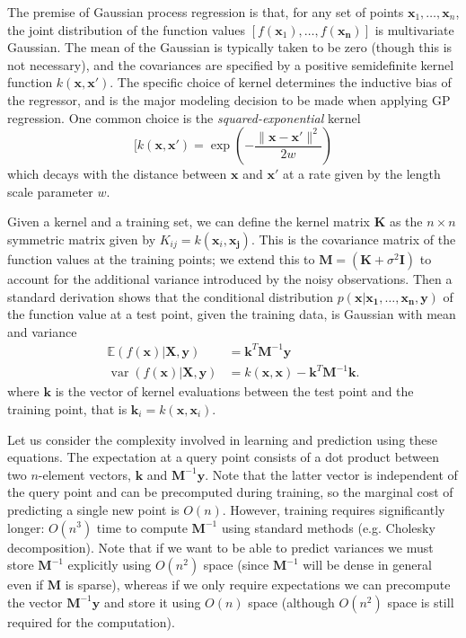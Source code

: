 \documentclass{article}
\DeclareMathOperator*{\var}{var}
\begin{document}
The premise of Gaussian process regression is that, for any set of points $\mathbf{x}_1, \ldots, \mathbf{x}_n$, the joint distribution of the function values $[f(\mathbf{x}_1), \ldots, f(\mathbf{x_n})]$ is multivariate Gaussian. The mean of the Gaussian is typically taken to be zero (though this is not necessary), and the covariances are specified by a positive semidefinite kernel function $k(\mathbf{x}, \mathbf{x'})$. The specific choice of kernel determines the inductive bias of the regressor, and is the major modeling decision to be made when applying GP regression. One common choice is the {\em squared-exponential} kernel\begin{equation}[k(\mathbf{x}, \mathbf{x'}) = \exp\left (- \frac{ \|\mathbf{x} - \mathbf{x'}\|^2 }{2w} \right)\end{equation}
which decays with the distance between $\mathbf{x}$ and $\mathbf{x'}$ at a rate given by the length scale parameter $w$. 

Given a kernel and a training set, we can define the kernel matrix $\mathbf{K}$ as the $n \times n$ symmetric matrix given by $K_{ij} = k(\mathbf{x}_i, \mathbf{x_j})$. This is the covariance matrix of the function values at the training points; we extend this to $\mathbf{M} = (\mathbf{K} + \sigma^2\mathbf{I})$ to account for the additional variance introduced by the noisy observations. Then a standard derivation \cite{rasmussen06} shows that the conditional distribution $p(\mathbf{x} | \mathbf{x_1}, \ldots, \mathbf{x_n}, \mathbf{y})$ of the function value at a test point, given the training data, is Gaussian with mean and variance
\begin{align}
\mathbb{E}(f(\mathbf{x}) | \mathbf{X}, \mathbf{y}) &= \mathbf{k}^T \mathbf{M}^{-1} \mathbf{y}\\
\var(f(\mathbf{x}) | \mathbf{X}, \mathbf{y}) &= k(\mathbf{x}, \mathbf{x}) - \mathbf{k}^T \mathbf{M}^{-1} \mathbf{k}.
\end{align}
where $\mathbf{k}$ is the vector of kernel evaluations between the test point and the training point, that is $\mathbf{k}_i = k(\mathbf{x},\mathbf{x}_i)$. 

Let us consider the complexity involved in learning and prediction using these equations. The expectation at a query point consists of a dot product between two $n$-element vectors, $\mathbf{k}$ and $\mathbf{M}^{-1} \mathbf{y}$. Note that the latter vector is independent of the query point and can be precomputed during training, so the marginal cost of predicting a single new point is $O(n)$. However, training requires significantly longer: $O(n^3)$ time to compute $\mathbf{M}^{-1}$ using standard methods (e.g. Cholesky decomposition). Note that if we want to be able to predict variances we must store $\mathbf{M}^{-1}$ explicitly using $O(n^2)$ space (since $\mathbf{M}^{-1}$ will be dense in general even if $\mathbf{M}$ is sparse), whereas if we only require expectations we can precompute the vector $\mathbf{M}^{-1}\mathbf{y}$ and store it using $O(n)$ space (although $O(n^2)$ space is still required for the computation).
\end{document}
